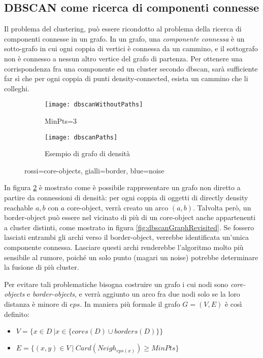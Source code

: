 \subsection{DBSCAN come ricerca di componenti connesse }
Il problema del clustering, può essere ricondotto al problema della ricerca di componenti connesse in un grafo.
In un grafo, una \emph{componente connessa} è un sotto-grafo in cui ogni coppia di vertici è connessa da un cammino, e il sottografo non è connesso  a nessun altro vertice  del grafo di partenza. Per ottenere una corrispondenza fra una  componente ed  un cluster secondo dbscan, sarà sufficiente far sì che per ogni coppia di punti  density-connected, esista un cammino che li colleghi.
\begin{figure}
    \centering
    \begin{subfigure}[b]{0.45\textwidth}
        \centering
        \texttt{[image: dbscanWithoutPaths]}
       	\caption{ MinPts=3}
         \label{fig:densityConnectedObjects}
    \end{subfigure}
    \hfill
    \begin{subfigure}[b]{0.45\textwidth}
        \centering
        \texttt{[image: dbscanPaths]}
        \caption{Esempio di grafo di densità}
         \label{fig:graphdensityConnectedObjects}
    \end{subfigure}
    \hfill
    \caption{rossi=core-objects, gialli=border,
    	blue=noise}
    \label{fig:dbscangraph}
\end{figure} 
In figura \ref{fig:graphdensityConnectedObjects} è mostrato come è possibile rappresentare un grafo non diretto a partire da connessioni di densità: per ogni coppia di oggetti di  directly density reachable $a,b$ con $a$ core-object,
verrà creato un arco $(a,b)$.
Talvolta però, un border-object può essere nel vicinato di più di un core-object anche appartenenti a cluster distinti, come mostrato in figura \ref{fig:dbscanGraphRevisited}. Se fossero lasciati entrambi gli archi verso il border-object, verrebbe identificata un'unica componente connessa. Lasciare questi archi renderebbe l'algoritmo molto più sensibile al rumore, poiché  un solo punto (magari un noise) potrebbe determinare la fusione di più cluster.

Per evitare tali problematiche bisogna costruire un grafo i cui nodi sono \emph{core-objects} e \emph{border-objects}, e verrà aggiunto un arco fra due nodi solo se la loro distanza è minore di $eps$.  In maniera più formale il grafo $
G=(V,E)$ è così definito:
\begin{itemize}
\item $ V= \lbrace x \in D \:| x \in \{ cores(D) \cup borders(D)\}\} $
\item 
$ E = \lbrace (x,y) \in V \:| \: Card(Neigh_{eps(x)}) \ge MinPts\rbrace$

\end{itemize}

